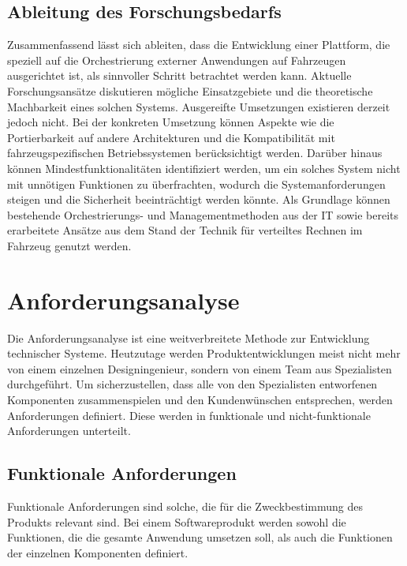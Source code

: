 \subsection{Ableitung des Forschungsbedarfs}
Zusammenfassend lässt sich ableiten, dass die Entwicklung einer Plattform, die speziell auf die Orchestrierung externer Anwendungen auf Fahrzeugen ausgerichtet ist, als sinnvoller Schritt betrachtet werden kann. Aktuelle Forschungsansätze diskutieren mögliche Einsatzgebiete und die theoretische Machbarkeit eines solchen Systems. Ausgereifte Umsetzungen existieren derzeit jedoch nicht. Bei der konkreten Umsetzung können Aspekte wie die Portierbarkeit auf andere Architekturen und die Kompatibilität mit fahrzeugspezifischen Betriebssystemen berücksichtigt werden. Darüber hinaus können Mindestfunktionalitäten identifiziert werden, um ein solches System nicht mit unnötigen Funktionen zu überfrachten, wodurch die Systemanforderungen steigen und die Sicherheit beeinträchtigt werden könnte. Als Grundlage können bestehende Orchestrierungs- und Managementmethoden aus der IT sowie bereits erarbeitete Ansätze aus dem Stand der Technik für verteiltes Rechnen im Fahrzeug genutzt werden.

\section{Anforderungsanalyse}
\label{sec:Anforderungsanalyse}

Die Anforderungsanalyse ist eine weitverbreitete Methode zur Entwicklung technischer Systeme. Heutzutage werden Produktentwicklungen meist nicht mehr von einem einzelnen Designingenieur, sondern von einem Team aus Spezialisten durchgeführt. Um sicherzustellen, dass alle von den Spezialisten entworfenen Komponenten zusammenspielen und den Kundenwünschen entsprechen, werden Anforderungen definiert. Diese werden in funktionale und nicht-funktionale Anforderungen unterteilt. \cite{Grady2010}

\subsection{Funktionale Anforderungen}

Funktionale Anforderungen sind solche, die für die Zweckbestimmung des Produkts relevant sind. Bei einem Softwareprodukt werden sowohl die Funktionen, die die gesamte Anwendung umsetzen soll, als auch die Funktionen der einzelnen Komponenten definiert.

